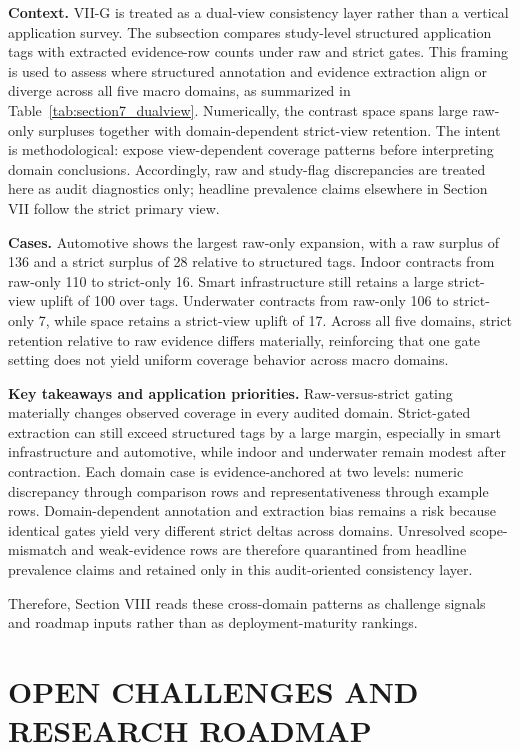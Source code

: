 \documentclass[lettersize,journal]{IEEEtran}
\begin{document}
\textbf{Context.} VII-G is treated as a dual-view consistency layer rather than a vertical application survey. The subsection compares study-level structured application tags with extracted evidence-row counts under raw and strict gates. This framing is used to assess where structured annotation and evidence extraction align or diverge across all five macro domains, as summarized in Table~\ref{tab:section7_dualview}. Numerically, the contrast space spans large raw-only surpluses together with domain-dependent strict-view retention. The intent is methodological: expose view-dependent coverage patterns before interpreting domain conclusions. Accordingly, raw and study-flag discrepancies are treated here as audit diagnostics only; headline prevalence claims elsewhere in Section VII follow the strict primary view.

\textbf{Cases.} Automotive shows the largest raw-only expansion, with a raw surplus of 136 and a strict surplus of 28 relative to structured tags. Indoor contracts from raw-only 110 to strict-only 16. Smart infrastructure still retains a large strict-view uplift of 100 over tags. Underwater contracts from raw-only 106 to strict-only 7, while space retains a strict-view uplift of 17. Across all five domains, strict retention relative to raw evidence differs materially, reinforcing that one gate setting does not yield uniform coverage behavior across macro domains.

\textbf{Key takeaways and application priorities.} Raw-versus-strict gating materially changes observed coverage in every audited domain. Strict-gated extraction can still exceed structured tags by a large margin, especially in smart infrastructure and automotive, while indoor and underwater remain modest after contraction. Each domain case is evidence-anchored at two levels: numeric discrepancy through comparison rows and representativeness through example rows. Domain-dependent annotation and extraction bias remains a risk because identical gates yield very different strict deltas across domains. Unresolved scope-mismatch and weak-evidence rows are therefore quarantined from headline prevalence claims and retained only in this audit-oriented consistency layer.

Therefore, Section VIII reads these cross-domain patterns as challenge signals and roadmap inputs rather than as deployment-maturity rankings.

\section{OPEN CHALLENGES AND RESEARCH ROADMAP}
\end{document}
